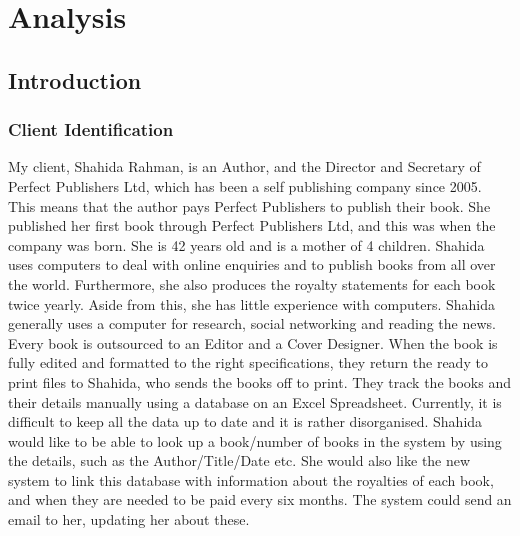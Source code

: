 
\chapter{Analysis}

\section{Introduction}

\subsection{Client Identification}
My client, Shahida Rahman, is an Author, and the Director and Secretary of Perfect Publishers Ltd, which has been a self publishing company since 2005. This means that the author pays Perfect Publishers to publish their book. She published her first book through Perfect Publishers Ltd, and this was when the company was born. She is 42 years old and is a mother of 4 children. Shahida uses computers to deal with online enquiries and to publish books from all over the world. Furthermore, she also produces the royalty statements for each book twice yearly. Aside from this, she has little experience with computers. Shahida generally uses a computer for research, social networking and reading the news. Every book is outsourced to an Editor and a Cover Designer. When the book is fully edited and formatted to the right specifications, they return the ready to print files to Shahida, who sends the books off to print. They track the books and their details manually using a database on an Excel Spreadsheet. Currently, it is difficult to keep all the data up to date and it is rather disorganised. Shahida would like to be able to look up a book/number of books in the system by using the details, such as the Author/Title/Date etc. She would also like the new system to link this database with information about the royalties of each book, and when they are needed to be paid every six months. The system could send an email to her, updating her about these.

